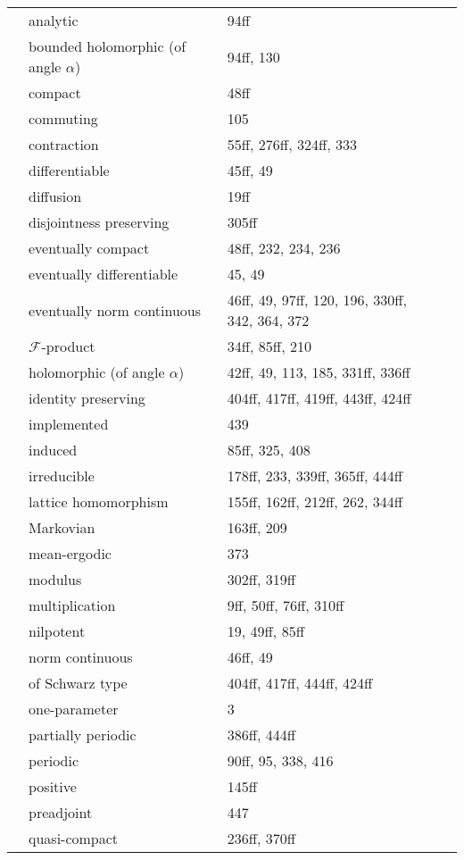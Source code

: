 \begin{longtable}{>{\bfseries}p{5cm}p{4cm}p{4cm}p{4cm}}
	& analytic 	& 94ff \\
	& bounded holomorphic (of angle $ \alpha $) 	& 94ff, 130 \\
	& compact 	& 48ff \\
	& commuting 	& 105 \\
	& contraction 	& 55ff, 276ff, 324ff, 333 \\
	& differentiable 	& 45ff, 49 \\
	& diffusion 	& 19ff \\
	& disjointness preserving 	& 305ff \\
	& eventually compact 	& 48ff, 232, 234, 236 \\
	& eventually differentiable 	& 45, 49 \\
	& eventually norm continuous 	& 46ff, 49, 97ff, 120, 196, 330ff, 342, 364, 372 \\
	& $\mathcal{F}$-product 	& 34ff, 85ff, 210 \\
	& holomorphic (of angle $\alpha$) 	& 42ff, 49, 113, 185, 331ff, 336ff \\
	& identity preserving 	& 404ff, 417ff, 419ff, 443ff, 424ff \\
	& implemented 	& 439 \\
	& induced 	& 85ff, 325, 408 \\
	& irreducible 	& 178ff, 233, 339ff, 365ff, 444ff \\
	& lattice homomorphism 	& 155ff, 162ff, 212ff, 262, 344ff \\
	& Markovian 	& 163ff, 209 \\
	& mean-ergodic 	& 373 \\
	& modulus 	& 302ff, 319ff \\
	& multiplication 	& 9ff, 50ff, 76ff, 310ff \\
	& nilpotent 	& 19, 49ff, 85ff \\
	& norm continuous 	& 46ff, 49 \\
	& of Schwarz type 	& 404ff, 417ff, 444ff, 424ff \\
	& one-parameter 	& 3 \\
	& partially periodic 	& 386ff, 444ff \\
	& periodic 	& 90ff, 95, 338, 416 \\
	& positive 	& 145ff \\
	& preadjoint 	& 447 \\
	& quasi-compact 	& 236ff, 370ff \\

\end{longtable}
